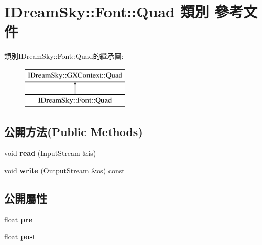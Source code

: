 \hypertarget{class_i_dream_sky_1_1_font_1_1_quad}{}\section{I\+Dream\+Sky\+:\+:Font\+:\+:Quad 類別 參考文件}
\label{class_i_dream_sky_1_1_font_1_1_quad}
類別\+I\+Dream\+Sky\+:\+:Font\+:\+:Quad的繼承圖\+:\begin{figure}[H]
\begin{center}
\leavevmode
\includegraphics[height=2.000000cm]{class_i_dream_sky_1_1_font_1_1_quad}
\end{center}
\end{figure}
\subsection*{公開方法(Public Methods)}
\begin{DoxyCompactItemize}
\item 
void {\bfseries read} (\hyperlink{class_i_dream_sky_1_1_input_stream}{Input\+Stream} \&is)\hypertarget{class_i_dream_sky_1_1_font_1_1_quad_aa974bb54952577c842a6480dda1bf1d7}{}\label{class_i_dream_sky_1_1_font_1_1_quad_aa974bb54952577c842a6480dda1bf1d7}

\item 
void {\bfseries write} (\hyperlink{class_i_dream_sky_1_1_output_stream}{Output\+Stream} \&os) const \hypertarget{class_i_dream_sky_1_1_font_1_1_quad_a56e38bcf523d65a5424f090f4e0e54a8}{}\label{class_i_dream_sky_1_1_font_1_1_quad_a56e38bcf523d65a5424f090f4e0e54a8}

\end{DoxyCompactItemize}
\subsection*{公開屬性}
\begin{DoxyCompactItemize}
\item 
float {\bfseries pre}\hypertarget{class_i_dream_sky_1_1_font_1_1_quad_ac075cd43a39a657eecac445e8da835be}{}\label{class_i_dream_sky_1_1_font_1_1_quad_ac075cd43a39a657eecac445e8da835be}

\item 
float {\bfseries post}\hypertarget{class_i_dream_sky_1_1_font_1_1_quad_a68d3341eb36eac6b82a8e5e60fb2be86}{}\label{class_i_dream_sky_1_1_font_1_1_quad_a68d3341eb36eac6b82a8e5e60fb2be86}

\end{DoxyCompactItemize}
